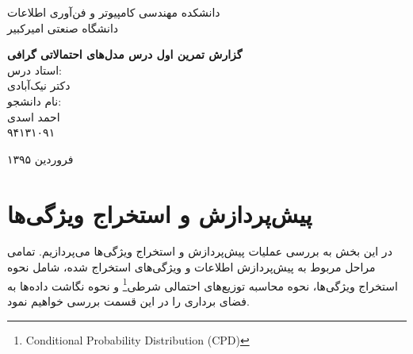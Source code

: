\documentclass[11.5pt,a4paper]{article}
\newcommand{\nocontentsline}[3]{}
\newcommand{\tocless}[2]{\bgroup\let\addcontentsline=\nocontentsline#1{#2}\egroup}
\begin{document}
\thispagestyle{empty}
\vspace*{-28mm}

\begin{center}
\vspace{-2mm}
{\LARGE
{
دانشکده مهندسی کامپیوتر و فن‌آوری اطلاعات\\	
دانشگاه صنعتی امیرکبیر	
}
\\[2.1cm]
}

{\large
\textbf{گزارش تمرین اول درس مدل‌های احتمالاتی گرافی}
\\[2cm]

استاد درس:
\\[.5cm]
{\Large
دکتر نیک‌آبادی}
\\[1.5cm]
\large 
نام دانشجو:
\\[.5cm]
{\Large
احمد اسدی}
\\[.5cm]
۹۴۱۳۱۰۹۱
\\[1.5cm]
}

{\large
فروردین ۱۳۹۵
}
\end{center}

\newpage
\baselineskip=1cm
\tocless\tableofcontents

\newpage
\baselineskip=0.75cm
\section{پیش‌پردازش و استخراج ویژگی‌ها}
در این بخش به بررسی عملیات پیش‌پردازش و استخراج ویژگی‌ها ‌می‌پردازیم. تمامی مراحل مربوط به پیش‌پردازش اطلاعات و ویژگی‌های استخراج شده، شامل نحوه استخراج ویژگی‌ها، نحوه محاسبه توزیع‌های احتمالی شرطی\footnote{Conditional Probability Distribution (CPD)} و نحوه نگاشت داده‌ها به فضای برداری را در این قسمت بررسی خواهیم نمود.
\end{document}
